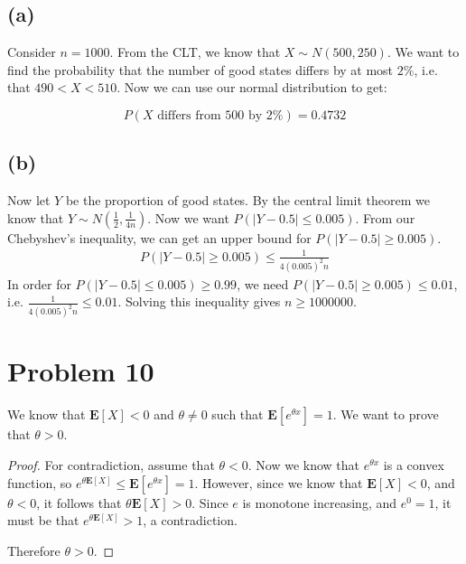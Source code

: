 \documentclass{article}
\begin{document}
	\subsection*{(a)}
	Consider $n = 1000$. From the CLT, we know that $X \sim N(500, 250)$. We want to find the probability that the number of good states differs by at most $2\%$, i.e. that $ 490 < X < 510$. Now we can use our normal distribution to get:
	
	\[ P(X \text{ differs from 500 by $2\%$} ) = 0.4732 \]
	
	\subsection*{(b)}
	Now let $Y$ be the proportion of good states. By the central limit theorem we know that $Y \sim N(\frac{1}{2}, \frac{1}{4n})$. Now we want $P(|Y-0.5|\leq 0.005)$. From our Chebyshev's inequality, we can get an upper bound for $P(|Y- 0.5 |\geq 0.005)$. 
	\begin{align*}
	P(|Y- 0.5 |\geq 0.005) \leq \frac{1}{4(0.005)^2 n}
	\end{align*}
	In order for $P(|Y-0.5| \leq 0.005) \geq 0.99$, we need $P(|Y - 0.5| \geq 0.005) \leq 0.01$, i.e. $\frac{1}{4(0.005)^2 n} \leq 0.01$. Solving this inequality gives $n \geq 1000000$. 
	
	\section*{Problem 10}
	We know that $\mathbf{E}[X] < 0$ and $\theta \neq 0$ such that $\mathbf{E}[e^{\theta x}] = 1$. We want to prove that $\theta > 0$. 
	
	\begin{proof}
	For contradiction, assume that $\theta < 0$. Now we know that $e^{\theta x}$ is a convex function, so $e^{\theta \mathbf{E}[X]} \leq \mathbf{E}[e^{\theta x}] =1$. However, since we know that $\mathbf{E}[X] < 0$, and $\theta < 0$, it follows that $\theta \mathbf{E}[X] > 0$. Since $e$ is monotone increasing, and $e^0 = 1$, it must be that $e^{\theta \mathbf{E}[X]} > 1$, a contradiction. 
	
	Therefore $\theta > 0$.  
	\end{proof}
\end{document}
